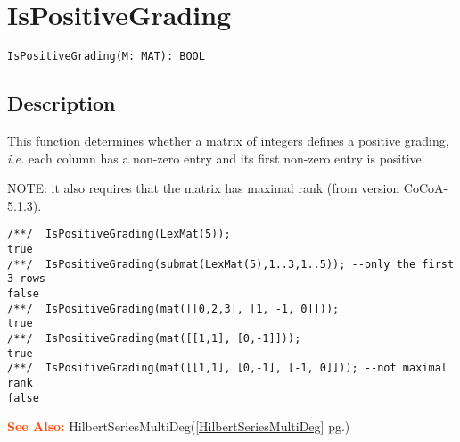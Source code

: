 \documentclass[a4paper]{mybook}
\newenvironment{command}{}{} %
\newcommand\SeeAlso{\par\textcolor{OrangeRed}{\textbf{\large See Also: }}}
\begin{document}
\section{IsPositiveGrading}
\label{IsPositiveGrading}
\begin{command} %


\begin{Verbatim}[label=syntax, rulecolor=\color{MidnightBlue},
frame=single]
IsPositiveGrading(M: MAT): BOOL
\end{Verbatim}


\subsection*{Description}

This function determines whether a matrix of integers defines a
positive grading, \textit{i.e.} each column has a non-zero entry and its
first non-zero entry is positive.
\par 
NOTE: it also requires that the matrix has maximal rank (from
version CoCoA-5.1.3).
\begin{Verbatim}[label=example, rulecolor=\color{PineGreen}, frame=single]
/**/  IsPositiveGrading(LexMat(5));
true
/**/  IsPositiveGrading(submat(LexMat(5),1..3,1..5)); --only the first 3 rows
false
/**/  IsPositiveGrading(mat([[0,2,3], [1, -1, 0]]));
true
/**/  IsPositiveGrading(mat([[1,1], [0,-1]]));
true
/**/  IsPositiveGrading(mat([[1,1], [0,-1], [-1, 0]])); --not maximal rank
false
\end{Verbatim}


\SeeAlso %
  HilbertSeriesMultiDeg(\ref{HilbertSeriesMultiDeg} pg.\pageref{HilbertSeriesMultiDeg})
\end{command} %
\end{document}
